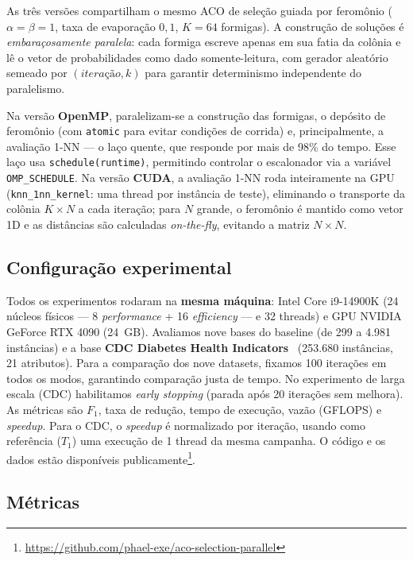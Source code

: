 \documentclass[12pt]{article}
\begin{document}
As três versões compartilham o mesmo ACO de seleção guiada por feromônio
($\alpha = \beta = 1$, taxa de evaporação $0{,}1$, $K = 64$ formigas). A construção de soluções
é \textit{embaraçosamente paralela}: cada formiga escreve apenas em sua fatia da colônia e lê o
vetor de probabilidades como dado somente-leitura, com gerador aleatório semeado por
$(\textit{iteração}, k)$ para garantir determinismo independente do paralelismo.

Na versão \textbf{OpenMP}, paralelizam-se a construção das formigas, o depósito de feromônio
(com \texttt{atomic} para evitar condições de corrida) e, principalmente, a avaliação 1-NN ---
o laço quente, que responde por mais de 98\% do tempo. Esse laço usa
\texttt{schedule(runtime)}, permitindo controlar o escalonador via a variável
\texttt{OMP\_SCHEDULE}. Na versão \textbf{CUDA}, a avaliação 1-NN roda inteiramente na GPU
(\texttt{knn\_1nn\_kernel}: uma thread por instância de teste), eliminando o transporte da
colônia $K\times N$ a cada iteração; para $N$ grande, o feromônio é mantido como vetor 1D e as
distâncias são calculadas \textit{on-the-fly}, evitando a matriz $N\times N$.

\subsection{Configuração experimental}

Todos os experimentos rodaram na \textbf{mesma máquina}: Intel Core i9-14900K (24 núcleos
físicos --- 8 \textit{performance} + 16 \textit{efficiency} --- e 32 threads) e GPU NVIDIA
GeForce RTX 4090 (24~GB). Avaliamos nove bases do baseline (de 299 a 4.981 instâncias) e a base
\textbf{CDC Diabetes Health Indicators}~\cite{cdcdataset} (253.680 instâncias, 21 atributos).
Para a comparação dos nove datasets, fixamos 100 iterações em todos os modos, garantindo
comparação justa de tempo. No experimento de larga escala (CDC) habilitamos \textit{early
stopping} (parada após 20 iterações sem melhora). As métricas são $F_1$, taxa de redução, tempo
de execução, vazão (GFLOPS) e \textit{speedup}. Para o CDC, o \textit{speedup} é normalizado por
iteração, usando como referência ($T_1$) uma execução de 1 thread da mesma campanha. O código e
os dados estão disponíveis publicamente\footnote{\url{https://github.com/phael-exe/aco-selection-parallel}}.

\subsection{Métricas}
\end{document}
